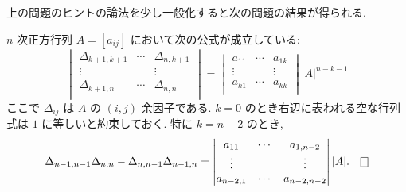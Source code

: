 \documentclass[12pt,twoside]{jarticle}
\begin{document}

上の問題のヒントの論法を少し一般化すると次の問題の結果が得られる.

\begin{question}
  \label{q:Jacobi-identity-1}
  $n$ 次正方行列 $A=[a_{ij}]$ において次の公式が成立している:
  \begin{equation*}
    \begin{vmatrix}
      \Delta_{k+1,k+1} & \cdots & \Delta_{n,k+1} \\
      \vdots           &        & \vdots \\
      \Delta_{k+1,n}   & \cdots & \Delta_{n,n} \\
    \end{vmatrix}
    =
    \begin{vmatrix}
      a_{11} & \cdots & a_{1k} \\
      \vdots &        & \vdots \\
      a_{k1} & \cdots & a_{kk} \\
    \end{vmatrix}
    |A|^{n-k-1}
  \end{equation*}
  ここで $\Delta_{ij}$ は $A$ の $(i,j)$ 余因子である.
  $k=0$ のとき右辺に表われる空な行列式は $1$ に等しいと約束しておく. 
  特に $k=n-2$ のとき, 
  \begin{equation*}
      \Delta_{n-1,n-1} \Delta_{n,n}
    - \Delta_{n,n-1} \Delta_{n-1,n}
    = 
    \begin{vmatrix}
      a_{11}    & \cdots & a_{1,n-2} \\
      \vdots    &        & \vdots \\
      a_{n-2,1} & \cdots & a_{n-2,n-2} \\
    \end{vmatrix}
    |A|.
  \qed
  \end{equation*}
\end{question}
\end{document}
